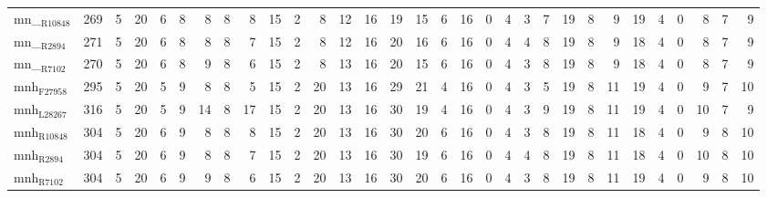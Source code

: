 \begin{center}
\begin{tabular}{lrrrrrrrrrrrrrrrrrrrrrrrrrrrrrr}
mn\_$_{\text{R10848}}$ & 269 & 5 & 20 & 6 & 8 & 8 & 8 & 8 & 15 & 2 & 8 & 12 & 16 & 19 & 15 & 6 & 16 & 0 & 4 & 3 & 7 & 19 & 8 & 9 & 19 & 4 & 0 & 8 & 7 & 9\\
mn\_$_{\text{R2894}}$ & 271 & 5 & 20 & 6 & 8 & 8 & 8 & 7 & 15 & 2 & 8 & 12 & 16 & 20 & 16 & 6 & 16 & 0 & 4 & 4 & 8 & 19 & 8 & 9 & 18 & 4 & 0 & 8 & 7 & 9\\
mn\_$_{\text{R7102}}$ & 270 & 5 & 20 & 6 & 8 & 9 & 8 & 6 & 15 & 2 & 8 & 13 & 16 & 20 & 15 & 6 & 16 & 0 & 4 & 3 & 8 & 19 & 8 & 9 & 18 & 4 & 0 & 8 & 7 & 9\\
mnh$_{\text{F27958}}$ & 295 & 5 & 20 & 5 & 9 & 8 & 8 & 5 & 15 & 2 & 20 & 13 & 16 & 29 & 21 & 4 & 16 & 0 & 4 & 3 & 5 & 19 & 8 & 11 & 19 & 4 & 0 & 9 & 7 & 10\\
mnh$_{\text{L28267}}$ & 316 & 5 & 20 & 5 & 9 & 14 & 8 & 17 & 15 & 2 & 20 & 13 & 16 & 30 & 19 & 4 & 16 & 0 & 4 & 3 & 9 & 19 & 8 & 11 & 19 & 4 & 0 & 10 & 7 & 9\\
mnh$_{\text{R10848}}$ & 304 & 5 & 20 & 6 & 9 & 8 & 8 & 8 & 15 & 2 & 20 & 13 & 16 & 30 & 20 & 6 & 16 & 0 & 4 & 3 & 8 & 19 & 8 & 11 & 18 & 4 & 0 & 9 & 8 & 10\\
mnh$_{\text{R2894}}$ & 304 & 5 & 20 & 6 & 9 & 8 & 8 & 7 & 15 & 2 & 20 & 13 & 16 & 30 & 19 & 6 & 16 & 0 & 4 & 4 & 8 & 19 & 8 & 11 & 18 & 4 & 0 & 10 & 8 & 10\\
mnh$_{\text{R7102}}$ & 304 & 5 & 20 & 6 & 9 & 9 & 8 & 6 & 15 & 2 & 20 & 13 & 16 & 30 & 20 & 6 & 16 & 0 & 4 & 3 & 8 & 19 & 8 & 11 & 19 & 4 & 0 & 9 & 8 & 10\\
\end{tabular}
\end{center}
